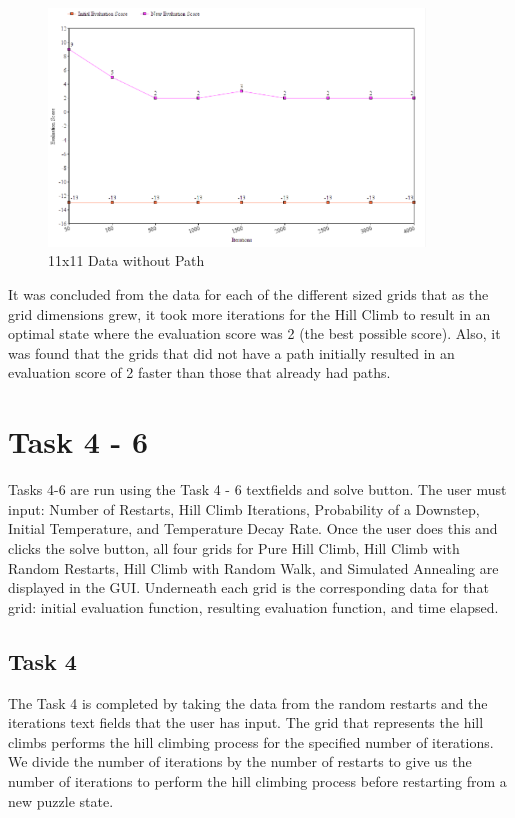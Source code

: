 \documentclass[11pt, oneside]{article}   	%
\begin{document}
\begin{figure}[H]
\centering
\includegraphics[width=100mm]{11x11noPath.png}
\caption{11x11 Data without Path}
\label{fig:method}
\end{figure}

It was concluded from the data for each of the different sized grids that as the grid dimensions grew, it took more iterations for the Hill Climb to result in an optimal state where the evaluation score was 2 (the best possible score). Also, it was found that the grids that did not have a path initially resulted in an evaluation score of 2 faster than those that already had paths.

\section{Task 4 - 6}

Tasks 4-6 are run using the Task 4 - 6 textfields and solve button. The user must input: Number of Restarts, Hill Climb Iterations, Probability of a Downstep, Initial Temperature, and Temperature Decay Rate. Once the user does this and clicks the solve button, all four grids for Pure Hill Climb, Hill Climb with Random Restarts, Hill Climb with Random Walk, and Simulated Annealing are displayed in the GUI. Underneath each grid is the corresponding data for that grid: initial evaluation function, resulting evaluation function, and time elapsed.

\subsection{Task 4}
The Task 4 is completed by taking the data from the random restarts and the iterations text fields that the user has input. The grid that represents the hill climbs performs the hill climbing process for the specified number of iterations. We divide the number of iterations by the number of restarts to give us the number of iterations to perform the hill climbing process before restarting from a new puzzle state.
\end{document}
